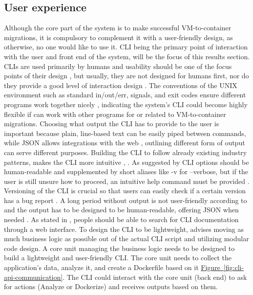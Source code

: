 \documentclass[twocolumn]{article}
\newcommand{\FigRef}[1]{\hyperref[#1]{Figure~\ref{#1}}}
\begin{document}
\subsection{User experience}
Although the core part of the system is to make successful VM-to-container migrations, it is compulsory to complement it with a user-friendly design, as otherwise, no one would like to use it. CLI being the primary point of interaction with the user and front end of the system, will be the focus of this results section. CLIs are used primarily by humans and usability should be one of the focus points of their design \cite{Newton-2016}, but usually, they are not designed for humans first, nor do they provide a good level of interaction design \cite{Tiedemann-2023}. The conventions of the UNIX environment such as standard in/out/err, signals, and exit codes ensure different programs work together nicely \cite{Tiedemann-2023}, indicating the system's CLI could become highly flexible if can work with other programs for or related to VM-to-container migrations. Choosing what output the CLI has to provide to the user is important because plain, line-based text can be easily piped between commands, while JSON allows integrations with the web \cite{Tiedemann-2023}, outlining different form of output can serve different purposes. Building the CLI to follow already existing industry patterns, makes the CLI more intuitive \cite{Tiedemann-2023}, \cite{Newton-2016}. As suggested by \cite{Newton-2016} CLI options should be human-readable and supplemented by short aliases like -v for –verbose, but if the user is still unsure how to proceed, an intuitive help command must be provided \cite{Salesforce-2024}. Versioning of the CLI is crucial so that users can easily check if a certain version has a bug report \cite{Salesforce-2024}. A long period without output is not user-friendly according to \cite{Salesforce-2024} and the output has to be designed to be human-readable, offering JSON when needed \cite{PrasadEtAl-2024}. As stated in \cite{Tiedemann-2023}, people should be able to search for CLI documentation through a web interface. To design the CLI to be lightweight, \cite{Salesforce-2024} advises moving as much business logic as possible out of the actual CLI script and utilizing modular code design. A core unit managing the business logic needs to be designed to build a lightweight and user-friendly CLI. The core unit needs to collect the application’s data, analyze it, and create a Dockerfile based on it \FigRef{fig:cli-api-communication}. The CLI could interact with the core unit (back end) to ask for actions (Analyze or Dockerize) and receives outputs based on them.
\end{document}
